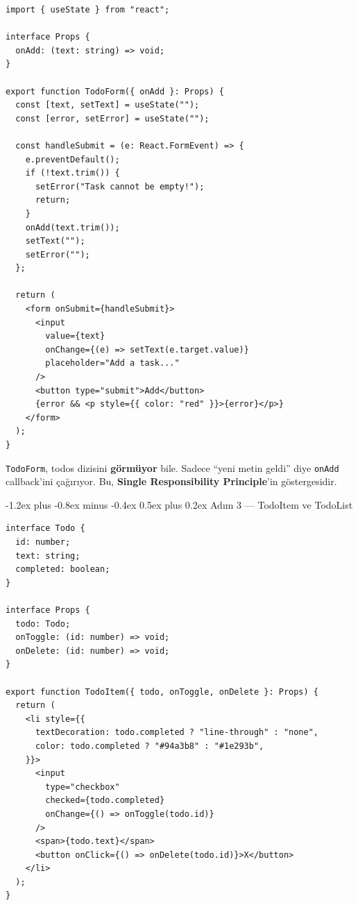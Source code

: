 \documentclass[12pt, a4paper]{article}
\makeatletter
\renewcommand{\subsection}{%
  \@startsection{subsection}{2}{\z@}%
    {-1.2ex plus -0.8ex minus -0.4ex}%
    {0.5ex plus 0.2ex}%
    {\normalfont\large\bfseries\sffamily\color{secondary}}%
}
\makeatother
\begin{document}
\begin{tcolorbox}[enhanced, colback=codebg, colframe=gray!30,
    colbacktitle=primary!85!black, coltitle=white, arc=4pt,
    title={\sffamily\bfseries\small src/components/TodoForm.tsx}]
\begin{lstlisting}[style=jsxstyle]
import { useState } from "react";

interface Props {
  onAdd: (text: string) => void;
}

export function TodoForm({ onAdd }: Props) {
  const [text, setText] = useState("");
  const [error, setError] = useState("");

  const handleSubmit = (e: React.FormEvent) => {
    e.preventDefault();
    if (!text.trim()) {
      setError("Task cannot be empty!");
      return;
    }
    onAdd(text.trim());
    setText("");
    setError("");
  };

  return (
    <form onSubmit={handleSubmit}>
      <input
        value={text}
        onChange={(e) => setText(e.target.value)}
        placeholder="Add a task..."
      />
      <button type="submit">Add</button>
      {error && <p style={{ color: "red" }}>{error}</p>}
    </form>
  );
}
\end{lstlisting}
\end{tcolorbox}

\vspace{6pt}

\begin{infobox}
\texttt{TodoForm}, todos dizisini \textbf{görmüyor} bile. Sadece
``yeni metin geldi'' diye \texttt{onAdd} callback'ini çağırıyor.
Bu, \textbf{Single Responsibility Principle}'in göstergesidir.
\end{infobox}

\newpage
\subsection{Adım 3 --- TodoItem ve TodoList}

\begin{tcolorbox}[enhanced, colback=codebg, colframe=gray!30,
    colbacktitle=primary!85!black, coltitle=white, arc=4pt,
    title={\sffamily\bfseries\small src/components/TodoItem.tsx}]
\begin{lstlisting}[style=jsxstyle]
interface Todo {
  id: number;
  text: string;
  completed: boolean;
}

interface Props {
  todo: Todo;
  onToggle: (id: number) => void;
  onDelete: (id: number) => void;
}

export function TodoItem({ todo, onToggle, onDelete }: Props) {
  return (
    <li style={{
      textDecoration: todo.completed ? "line-through" : "none",
      color: todo.completed ? "#94a3b8" : "#1e293b",
    }}>
      <input
        type="checkbox"
        checked={todo.completed}
        onChange={() => onToggle(todo.id)}
      />
      <span>{todo.text}</span>
      <button onClick={() => onDelete(todo.id)}>X</button>
    </li>
  );
}
\end{lstlisting}
\end{tcolorbox}
\end{document}
